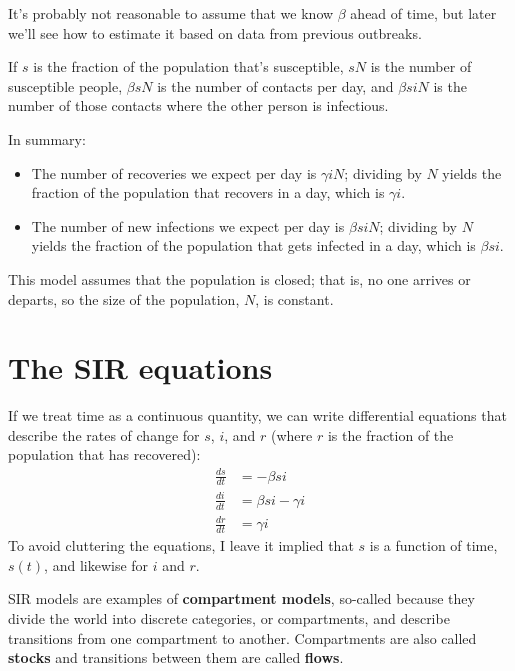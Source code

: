 \documentclass[12pt]{book}
\theoremstyle{exercise}
\begin{document}
It's probably not reasonable to assume that we know $\beta$ ahead of time, but later we'll see how to estimate it based on data from previous outbreaks.

If $s$ is the fraction of the population that's susceptible, $s N$ is the number of susceptible people, $\beta s N$ is the number of contacts per day, and $\beta s i N$ is the number of those contacts where the other person is infectious.

In summary:

\begin{itemize}

\item The number of recoveries we expect per day is $\gamma i N$; dividing by $N$ yields the fraction of the population that recovers in a day, which is $\gamma i$.

\item The number of new infections we expect per day is $\beta s i N$; dividing by $N$ yields the fraction of the population that gets infected in a day, which is $\beta s i$.

\end{itemize}

This model assumes that the population is closed; that is, no one arrives or departs, so the size of the population, $N$, is constant.


\section{The SIR equations}
\label{sireqn}

If we treat time as a continuous quantity, we can write differential equations that describe the rates of change for $s$, $i$, and $r$ (where $r$ is the fraction of the population that has recovered):
%
\begin{align*}
\frac{ds}{dt} &= -\beta s i \\
\frac{di}{dt} &= \beta s i - \gamma i\\
\frac{dr}{dt} &= \gamma i
\end{align*}
%
To avoid cluttering the equations, I leave it implied that $s$ is a function of time, $s(t)$, and likewise for $i$ and $r$.

SIR models are examples of {\bf compartment models}, so-called because they divide the world into discrete categories, or compartments, and describe transitions from one compartment to another.  Compartments are also called {\bf stocks} and transitions between them are called {\bf flows}.
\end{document}
